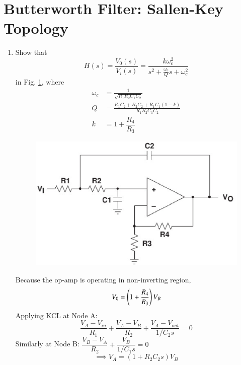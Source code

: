 \documentclass[journal,12pt,twocolumn]{IEEEtran}
\renewcommand\thesection{\arabic{section}}
\begin{document}
\section{Butterworth Filter: Sallen-Key Topology}
\begin{enumerate}[label=\thesection.\arabic*,ref=\thesection.\theenumi]
\item Show that 
\begin{equation}
\label{eq:tf}
H(s) = \frac{V_{0}(s)}{V_i(s)} = \frac{k\omega_{c}^{2}}{s^{2}+ \frac{\omega_{c}}{Q}s+\omega_{c}^{2}}
\end{equation}
in Fig. \ref{fig:butter},
where 
\begin{align}
\omega_c &= \frac{1}{\sqrt{R_{1}R_{2}C_{1}C_{2}}}
\\
Q &= \frac{R_{1}C_{2}+R_{2}C_{2}+R_{1}C_{1}(1-k)}{R_{1}R_{2}C_{1}C_{2}}
\\
k&=1+\dfrac{R_{4}}{R_{3}}
\end{align}
%
\begin{figure}[!ht]
\centering
\includegraphics[width=\columnwidth]{./figs/sallen_key_general.eps}
\caption{}
\label{fig:butter}
\end{figure}
\solution
Because the op-amp is operating in non-inverting region,
\begin{equation}
V_{0} = \left(1+\dfrac{R_{4}}{R_{3}}\right)V_{B}
\end{equation}
Applying KCL at Node A:
\begin{equation}
\dfrac{V_{A}-V_{in}}{R_{1}} + \dfrac{V_{A}-V_{B}}{R_{2}} + \dfrac{V_{A}-V_{out}}{1/C_{2}s} = 0
\end{equation}
Similarly at Node B:
$\dfrac{V_{B}-V_{A}}{R_{2}} + \dfrac{V_{B}}{1/C_{1}s}=0$
\begin{equation}
\implies V_{A}=(1+R_{2}C_{2}s)V_{B}

\end{equation}
\end{enumerate}
\end{document}

